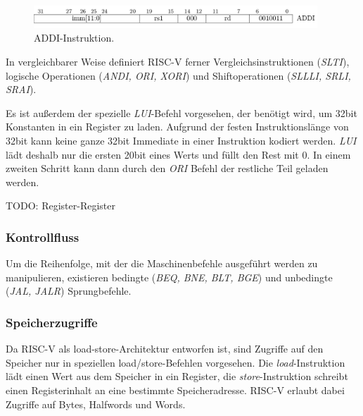 \begin{figure} [ht]
  \centering
  \includegraphics[width=0.95\textwidth]{Figures/ADDI}
  \caption{ADDI-Instruktion.}
  \label{fig:addi}
\end{figure}

In vergleichbarer Weise definiert RISC-V ferner Vergleichsinstruktionen (\textit{SLTI}), logische Operationen (\textit{ANDI, ORI, XORI}) und Shiftoperationen (\textit{SLLLI, SRLI, SRAI}). 

Es ist außerdem der spezielle \textit{LUI}-Befehl vorgesehen, der benötigt wird, um 32bit Konstanten in ein Register zu laden. Aufgrund der festen Instruktionslänge von 32bit kann keine ganze 32bit Immediate in einer Instruktion kodiert werden. \textit{LUI} lädt deshalb nur die ersten 20bit eines Werts und füllt den Rest mit $0$. In einem zweiten Schritt kann dann durch den \textit{ORI} Befehl der restliche Teil geladen werden.

TODO: Register-Register

\subsubsection{Kontrollfluss}
Um die Reihenfolge, mit der die Maschinenbefehle ausgeführt werden zu manipulieren, existieren bedingte (\textit{BEQ, BNE, BLT, BGE}) und unbedingte (\textit{JAL, JALR}) Sprungbefehle.

\subsubsection{Speicherzugriffe}
Da RISC-V als load-store-Architektur entworfen ist, sind Zugriffe auf den Speicher nur in speziellen load/store-Befehlen vorgesehen. Die \textit{load}-Instruktion lädt einen Wert aus dem Speicher in ein Register, die \textit{store}-Instruktion schreibt einen Registerinhalt an eine bestimmte Speicheradresse. RISC-V erlaubt dabei Zugriffe auf Bytes, Halfwords und Words.

